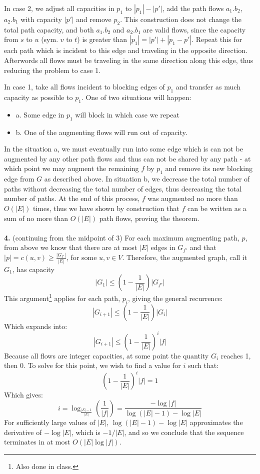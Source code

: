 \documentclass{article}
\begin{document}
In case 2, we adjust all capacities in $p_1$ to $|p_1| - |p'|$, add the path flows $a_1 . b_2$, $a_2 . b_1$ with capacity $|p'|$ and remove $p_2$.  This construction does not change the total path capacity, and both $a_1 . b_2$ and $a_2 . b_1$ are valid flows, since the capacity from $s$ to $u$ (sym. $v$ to $t$) is greater than $|p_1| = |p'| + |p_1 - p'|$.  Repeat this for each path which is incident to this edge and traveling in the opposite direction.  Afterwords all flows must be traveling in the same direction along this edge, thus reducing the problem to case 1.

In case 1, take all flows incident to blocking edges of $p_1$ and transfer as much capacity as possible to $p_1$.  One of two situations will happen:
\begin{itemize}
\item{a.} Some edge in $p_1$ will block in which case we repeat 
\item{b.} One of the augmenting flows will run out of capacity. 
\end{itemize}
In the situation a, we must eventually run into some edge which is can not be augmented by any other path flows and thus can not be shared by any path - at which point we may augment the remaining $f$ by $p_1$ and remove its new blocking edge from $G$ as described above.  In situation b, we decrease the total number of paths without decreasing the total number of edges, thus decreasing the total number of paths.  At the end of this process, $f$ was augmented no more than $O(|E|)$ times, thus we have shown by construction that $f$ can be written as a sum of no more than $O(|E|)$ path flows, proving the theorem.

\paragraph{} \textbf{4.} (continuing from the midpoint of 3)
For each maximum augmenting path, $p$, from above we know that there are at most $|E|$ edges in $G_{f'}$ and that $|p| = c(u,v) \geq \frac{ |G_{f'}| } { |E| }$, for some $u,v \in V$.  Therefore, the augmented graph, call it $G_1$, has capacity
\[ |G_1| \leq (1 - \frac{1}{|E|})|G_{f'}| \]
This argument\footnote{Also done in class.} applies for each path, $p_i$, giving the general recurrence:
\[ |G_{i+1}| \leq (1 - \frac{1}{|E|})|G_i| \]
Which expands into:
\[ |G_{i+1}| \leq (1 - \frac{1}{|E|})^i |f| \]
Because all flows are integer capacities, at some point the quantity $G_i$ reaches 1, then 0.  To solve for this point, we wish to find a value for $i$ such that:
\[ (1 - \frac{1}{|E|})^i |f| = 1 \]
Which gives:
\[ i = \log_{\frac{ |E| - 1 }{ |E| }} (\frac{1}{|f|}) = \frac{ -\log{|f|} }{ \log{(|E| - 1)} - \log{|E|} } \]
For sufficiently large values of $|E|$, $\log{(|E| - 1)} - \log{|E|}$ approximates the derivative of $-\log{|E|}$, which is $-1/|E|$, and so we conclude that the sequence terminates in at most $O(|E| \log{|f|})$.
\end{document}
